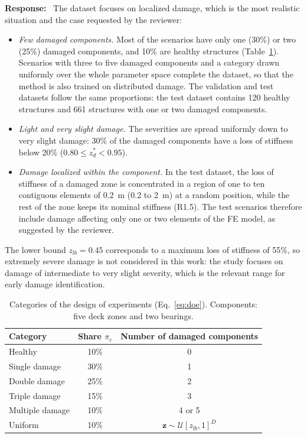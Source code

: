 \documentclass[11pt]{article}
\newenvironment{response}{\par\smallskip\noindent\color{resp}\textbf{Response:}\ }{\par}
\newcommand{\z}{\mathbf{z}}
\begin{document}
\begin{response}
The dataset focuses on localized damage, which is the most realistic situation and the case requested by the reviewer:
\begin{itemize}[leftmargin=*]
\item \emph{Few damaged components.} Most of the scenarios have only one (30\%) or two (25\%) damaged components, and 10\%
are healthy structures (Table~\ref{tab:doe}). Scenarios with three to five damaged components and a category drawn
uniformly over the whole parameter space complete the dataset, so that the method is also trained on distributed damage.
The validation and test datasets follow the same proportions: the test dataset contains 120 healthy structures and 661
structures with one or two damaged components.
\item \emph{Light and very slight damage.} The severities are spread uniformly down to very slight damage: 30\% of the
damaged components have a loss of stiffness below 20\% ($0.80\le z_d^*<0.95$).
\item \emph{Damage localized within the component.} In the test dataset, the loss of stiffness of a damaged zone is
concentrated in a region of one to ten contiguous elements of 0.2~m (0.2 to 2~m) at a random position, while the rest of
the zone keeps its nominal stiffness (R1.5). The test scenarios therefore include damage affecting only one or two
elements of the FE model, as suggested by the reviewer.
\end{itemize}
The lower bound $z_{lb}=0.45$ corresponds to a maximum loss of stiffness of 55\%, so extremely severe damage is not
considered in this work: the study focuses on damage of intermediate to very slight severity, which is the relevant
range for early damage identification.

\begin{table}[H]
\centering\small
\caption{Categories of the design of experiments (Eq.~\eqref{eq:doe}). Components: five deck zones and two bearings.}
\label{tab:doe}
\begin{tabular}{lcc}
\toprule
Category & Share $\pi_c$ & Number of damaged components \\
\midrule
Healthy & 10\% & 0 \\
Single damage & 30\% & 1 \\
Double damage & 25\% & 2 \\
Triple damage & 15\% & 3 \\
Multiple damage & 10\% & 4 or 5 \\
Uniform & 10\% & $\z\sim\mathcal{U}[z_{lb},1]^D$ \\
\bottomrule
\end{tabular}
\end{table}


\end{response}
\end{document}
